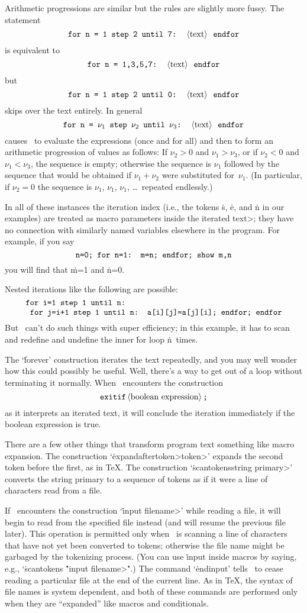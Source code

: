 Arithmetic progressions are similar but the rules are slightly more fussy.
The statement
$$\hbox{\tt for n = 1 step 2 until 7: \<text> endfor}$$
is equivalent to
$$\hbox{\tt for n = 1,3,5,7: \<text> endfor}$$
but
$$\hbox{\tt for n = 1 step 2 until 0: \<text> endfor}$$
skips over the text entirely. In general
$$\hbox{\tt for n = $\nu_1$ step $\nu_2$ until $\nu_3$: \<text> endfor}$$
causes \MF\ to evaluate the expressions (once and for all) and then to
form an arithmetic progression of values as follows:
If $\nu_2>0$ and $\nu_1>\nu_3$, or if $\nu_2<0$ and $\nu_1<\nu_3$,
the sequence is empty; otherwise the sequence is $\nu_1$ followed by the
sequence that would be obtained if $\nu_1+\nu_2$ were substituted
for~$\nu_1$. (In particular, if $\nu_2=0$ the sequence is $\nu_1$,
$\nu_1$, $\nu_1$, \dots\ repeated endlessly.)

In all of these instances the iteration index (i.e., the tokens
\.s, \.e, and \.n in our examples) are treated as macro parameters
inside the \<iterated text>; they have no connection with similarly named
variables elsewhere in the program. For example, if you say
$$\hbox{\tt n=0; for n=1: m=n; endfor; show m,n}$$
you will find that \.{m=1} and \.{n=0}.

Nested iterations like the following are possible:
$$\vcenter{\halign{\tt#\hfil\cr
for i=1 step 1 until n:\cr
\ for j=i+1 step 1 until n: a[i][j]=a[j][i]; endfor; endfor\cr}}$$
But \MF\ can't do such things with super efficiency; in this example,
it has to scan and redefine and undefine the inner \.{for} loop
\.n~times.

The `\.{forever}' construction iterates the text repeatedly, and you
may well wonder how this could possibly be useful. Well, there's a way to
get out of a loop without terminating it normally. When \MF\ encounters
the construction
$$\hbox{\.{exitif}\<boolean expression>\.;}$$
as it interprets an iterated text, it will conclude the iteration
immediately if the boolean expression is true.

There are a few other things that transform program text something like
macro expansion. The construction `\.{expandafter}\<token>\<token>'
expands the second token before the first, as in \TeX. The construction
`\.{scantokens}\<string primary>' converts the string primary to a
sequence of tokens as if it were a line of characters read from a file.

If \MF\ encounters the construction `\.{input} \<filename>' while reading
a file, it will begin to read from the specified file instead (and will
resume the previous file later). This operation is permitted only when
\MF\ is scanning a line of characters that have not yet been converted to
tokens; otherwise the file name might be garbaged by the tokenizing process.
(You can use \.{input} inside macros by saying, e.g., `\.{scantokens}
\.{"input} \<filename>\.{"}.)
The command `\.{endinput}' tells \MF\ to cease reading a particular file
at the end of the current line. As in \TeX, the syntax of file names
is system dependent, and both of these commands are performed only
when they are ``expanded'' like macros and conditionals.

